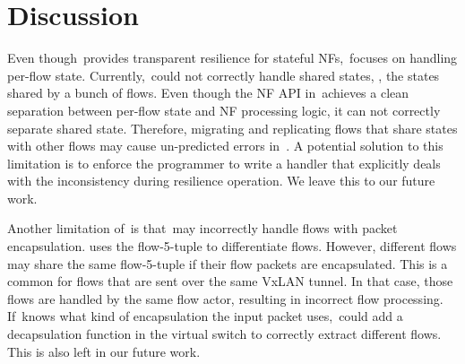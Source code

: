 \section{Discussion}
\label{sec:discussion}

Even though~\nfactor provides transparent resilience for stateful NFs,~\nfactor focuses on handling per-flow state. Currently,~\nfactor could not correctly handle shared states, \ie, the states shared by a bunch of flows. Even though the NF API in~\nfactor achieves a clean separation between per-flow state and NF processing logic, it can not correctly separate shared state. Therefore, migrating and replicating flows that share states with other flows may cause un-predicted errors in~\nfactor. A potential solution to this limitation is to enforce the programmer to write a handler that explicitly deals with the inconsistency during resilience operation. We leave this to our future work.

Another limitation of~\nfactor is that~\nfactor may incorrectly handle flows with packet encapsulation. \nfactor uses the flow-5-tuple to differentiate flows. However, different flows may share the same flow-5-tuple if their flow packets are encapsulated. This is a common for flows that are sent over the same VxLAN tunnel. In that case, those flows are handled by the same flow actor, resulting in incorrect flow processing. If~\nfactor knows what kind of encapsulation the input packet uses,~\nfactor could add a decapsulation function in the virtual switch to correctly extract different flows. This is also left in our future work.
